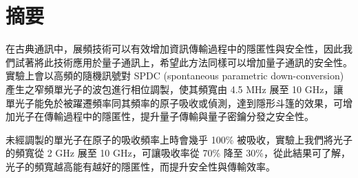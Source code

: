 \documentclass[class=NCU_thesis, crop=false]{standalone}
\begin{document}
\chapter{摘要}

在古典通訊中，展頻技術可以有效增加資訊傳輸過程中的隱匿性與安全性，因此我們試著將此技術應用於量子通訊上，希望此方法同樣可以增加量子通訊的安全性。實驗上會以高頻的隨機訊號對 SPDC (spontaneous parametric down-conversion) 產生之窄頻單光子的波包進行相位調製，使其頻寬由 4.5 MHz 展至 10 GHz，讓單光子能免於被躍遷頻率同其頻率的原子吸收或偵測，達到隱形斗篷的效果，可增加光子在傳輸過程中的隱匿性，提升量子傳輸與量子密鑰分發之安全性。

未經調製的單光子在原子的吸收頻率上時會幾乎 100\% 被吸收，實驗上我們將光子的頻寬從 2 GHz 展至 10 GHz，可讓吸收率從 70\% 降至 30\%，從此結果可了解，光子的頻寬越高能有越好的隱匿性，而提升安全性與傳輸效率。

\vspace{2em}
\end{document}
